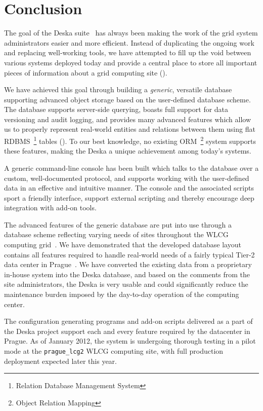 \documentclass[deska]{subfiles}
\begin{document}
\chapter{Conclusion}
\label{sec:conclusion}

The goal of the Deska suite~\cite{deska-project} has always been making the work of the grid system administrators
easier and more efficient.  Instead of duplicating the ongoing work and replacing well-working tools, we have attempted
to fill up the void between various systems deployed today and provide a central place to store all important pieces of
information about a grid computing site ().

We have achieved this goal through building a {\em generic}, versatile database supporting advanced object storage based
on the user-defined database scheme.  The database supports server-side querying, boasts full support for data
versioning and audit logging, and provides many advanced features which allow us to properly represent real-world
entities and relations between them using flat RDBMS~\footnote{Relation Database Management System} tables
().  To our best knowledge, no existing ORM~\footnote{Object Relation Mapping} system
supports these features, making the Deska a unique achievement among today's systems.

A generic command-line console has been built which talks to the database over a custom, well-documented protocol, and
supports working with the user-defined data in an effective and intuitive manner.  The console and the associated
scripts sport a friendly interface, support external scripting and thereby encourage deep integration with add-on tools.

The advanced features of the generic database are put into use through a database scheme reflecting varying needs of
sites throughout the WLCG computing grid~\cite{wlcg}.  We have demonstrated that the developed database layout contains
all features required to handle real-world needs of a fairly typical Tier-2 data center in Prague~\cite{farm}.  We have
converted the existing data from a proprietary in-house system into the Deska database, and based on the comments from
the site administrators, the Deska is very usable and could significantly reduce the maintenance burden imposed by the
day-to-day operation of the computing center.

The configuration generating programs and add-on scripts delivered as a part of the Deska project support each and every
feature required by the datacenter in Prague.  As of January 2012, the system is undergoing thorough testing in a pilot
mode at the {\tt prague\_lcg2} WLCG computing site, with full production deployment expected later this year.
\end{document}
